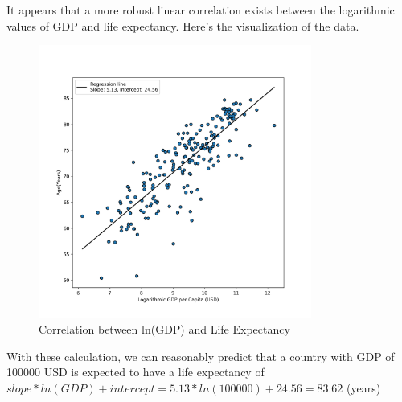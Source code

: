 It appears that a more robust linear correlation exists between the logarithmic values of GDP and life expectancy. Here's the visualization of the data.
\newpage
\begin{figure}[t]
    \centering
    \includegraphics[width=0.8\textwidth]{figures/scatterplot2.png}
    \caption{Correlation between ln(GDP) and Life Expectancy}
    \label{fig:gdp-lex-scatter2}
\end{figure}

With these calculation, we can reasonably predict that a country with GDP of 100000 USD is expected to have a life expectancy of $slope * ln(GDP) + intercept = 5.13 * ln(100000) + 24.56 = 83.62$ (years)
